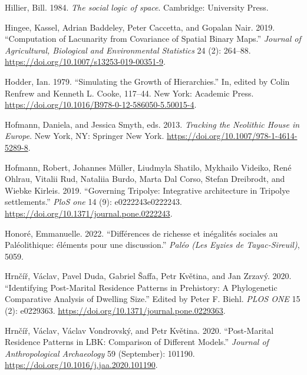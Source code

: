 \documentclass[
  12pt,
  a4paper, twoside]{book}
\newlength{\cslhangindent}
\newlength{\cslentryspacingunit} %
\newenvironment{CSLReferences}[2] %
 {%
  \setlength{\parindent}{0pt}
  \ifodd #1
  \let\oldpar\par
  \def\par{\hangindent=\cslhangindent\oldpar}
  \fi
  \setlength{\parskip}{#2\cslentryspacingunit}
 }%
 {}
\begin{document}
\begin{CSLReferences}{1}{0}
\leavevmode{}%
Hillier, Bill. 1984. \emph{The social logic of space}. Cambridge: University Press.

\leavevmode{}%
Hingee, Kassel, Adrian Baddeley, Peter Caccetta, and Gopalan Nair. 2019. {``Computation of Lacunarity from Covariance of Spatial Binary Maps.''} \emph{Journal of Agricultural, Biological and Environmental Statistics} 24 (2): 264--88. \url{https://doi.org/10.1007/s13253-019-00351-9}.

\leavevmode{}%
Hodder, Ian. 1979. {``Simulating the Growth of Hierarchies.''} In, edited by Colin Renfrew and Kenneth L. Cooke, 117--44. New York: Academic Press. \url{https://doi.org/10.1016/B978-0-12-586050-5.50015-4}.

\leavevmode{}%
Hofmann, Daniela, and Jessica Smyth, eds. 2013. \emph{Tracking the Neolithic House in Europe}. New York, NY: Springer New York. \url{https://doi.org/10.1007/978-1-4614-5289-8}.

\leavevmode{}%
Hofmann, Robert, Johannes Müller, Liudmyla Shatilo, Mykhailo Videiko, René Ohlrau, Vitalii Rud, Nataliia Burdo, Marta Dal Corso, Stefan Dreibrodt, and Wiebke Kirleis. 2019. {``Governing Tripolye: Integrative architecture in Tripolye settlements.''} \emph{PloS one} 14 (9): e0222243e0222243. \url{https://doi.org/10.1371/journal.pone.0222243}.

\leavevmode{}%
Honoré, Emmanuelle. 2022. {``Différences de richesse et inégalités sociales au Paléolithique: éléments pour une discussion.''} \emph{Paléo (Les Eyzies de Tayac-Sireuil)}, 5059.

\leavevmode{}%
Hrnčíř, Václav, Pavel Duda, Gabriel Šaffa, Petr Květina, and Jan Zrzavý. 2020. {``Identifying Post-Marital Residence Patterns in Prehistory: A Phylogenetic Comparative Analysis of Dwelling Size.''} Edited by Peter F. Biehl. \emph{PLOS ONE} 15 (2): e0229363. \url{https://doi.org/10.1371/journal.pone.0229363}.

\leavevmode{}%
Hrnčíř, Václav, Václav Vondrovský, and Petr Květina. 2020. {``Post-Marital Residence Patterns in LBK: Comparison of Different Models.''} \emph{Journal of Anthropological Archaeology} 59 (September): 101190. \url{https://doi.org/10.1016/j.jaa.2020.101190}.


\end{CSLReferences}
\end{document}
